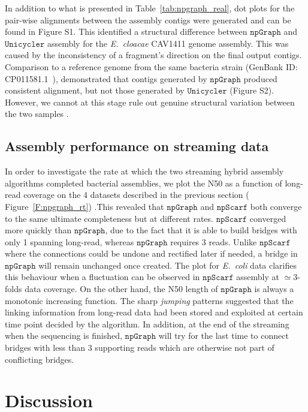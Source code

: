 \documentclass[10pt,letterpaper]{article}
\newcommand{\npscarf}{$\mathtt{npScarf}$}
\newcommand{\npgraph}{$\mathtt{npGraph}$}
\newcommand{\unicycler}{$\mathtt{Unicycler}$}
\newcommand{\ec}{\emph{E.~coli}}
\begin{document}
In addition to what is presented in Table~\ref{tab:npgraph_real}, dot plots for the pair-wise alignments between the assembly contigs were generated and can be found in Figure S1. This identified a structural difference between \npgraph{} and \unicycler{} assembly for the \emph{E.~cloacae} CAV1411 genome assembly. This was caused by the inconsistency of a fragment's direction on the final output contigs. Comparison to a reference 
 genome from the same bacteria strain (GenBank ID: CP011581.1~\cite{Potter2016rapid}), demonstrated that contigs generated by \npgraph{} produced consistent alignment, but not those generated by \unicycler{} (Figure S2). However, we cannot at this stage rule out genuine structural variation between the two samples .

\subsection*{Assembly performance on streaming data}
In order to investigate the rate at which the two streaming hybrid assembly algorithms completed bacterial assemblies, we plot the N50 as a function of long-read coverage on the 4 datasets described in the previous section ( Figure~\ref{F:npgraph_rt}) .This revealed that \npgraph{} and \npscarf{} both converge to the same ultimate completeness but at different rates. \npscarf{} converged more quickly than \npgraph{}, due to the fact that it is able to build bridges with only 1 spanning long-read, whereas \npgraph{} requires 3 reads.    
Unlike \npscarf{} where the connections could be undone and rectified later if needed, a bridge in \npgraph{} will remain unchanged once created.
The plot for \ec{} data clarifies this behaviour when a fluctuation can be observed in \npscarf{} assembly at $\simeq 3$-folds data coverage.
On the other hand, the N50 length of \npgraph{} is always a monotonic increasing function. 
The sharp \emph{jumping} patterns suggested that the linking information from long-read data had been stored and exploited at certain time point decided by the algorithm. 
In addition, at the end of the streaming when the sequencing is finished, \npgraph{} will try for the last time to connect bridges with less than 3 supporting reads which are otherwise not part of conflicting bridges.


\section*{Discussion}
\end{document}

